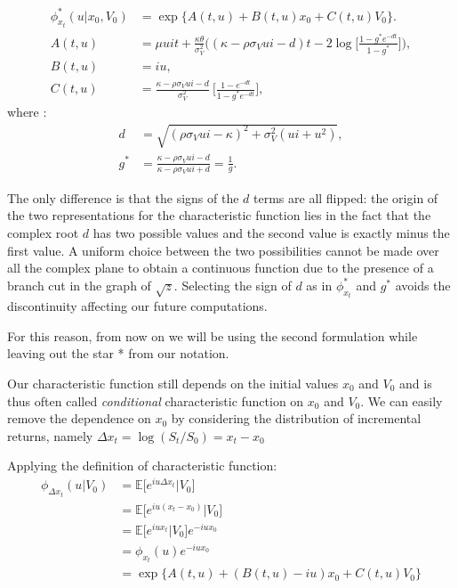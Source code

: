 \begin{subequations}
\begin{align}
\label{eq:heston_chf_trap}
\phi_{x_t}^*(u| x_0, V_0) &= \exp\{A(t,u) + B(t,u) x_0 + C(t,u) V_0\}.\nonumber\\
A(t,u) &= \mu u i t +  \frac{\kappa\theta}{\sigma_V^2} \bigg( (\kappa - \rho\sigma_V u i - d)t - 2 \log\Big[  \frac{1-g^*e^{-dt}}{1-g^*} \Big] \bigg),\\
B(t,u) &= i u ,\\
C(t,u)&= \frac{\kappa - \rho\sigma_V u i - d}{\sigma_V^2} \:\Big[\frac{1-e^{-dt}}{1-g^*e^{-dt}}\Big],
\end{align}
\end{subequations} 
where :
\begin{equation*}
\begin{split}
d&=\sqrt{(\rho \sigma_V u i - \kappa)^2 + \sigma_V^2(u i + u^2)},\\
g^*&= \frac{\kappa - \rho\sigma_V u i - d}{\kappa - \rho\sigma_V u i + d} = \frac{1}{g}.
\end{split}
\end{equation*} 

The only difference is that the signs of the $d$ terms are all flipped: the origin of the two representations for the characteristic function lies in the fact that the complex root $d$ has two possible values and the second value is exactly minus the first value.
A uniform choice between the two possibilities cannot be made over all the complex plane to obtain a continuous function due to the presence of a branch cut in the graph of $\sqrt{z}$. Selecting the sign of $d$ as in $\phi_{x_t}^*$ and $g^*$ avoids the discontinuity affecting our future computations.

For this reason, from now on we will be using the second formulation while leaving out the star * from our notation.

\bigskip


Our characteristic function still depends on the initial values $x_0$ and  $V_0$ and is thus often called \textit{conditional} characteristic function on $x_0$ and $V_0$.
We can easily remove the dependence on $x_0$ by considering the distribution of incremental returns, namely $\Delta x_t = \log (S_t / S_0) = x_t - x_0$

Applying the definition of characteristic function:
\begin{equation*}
	\begin{split}
	\phi_{\Delta x_t}(u|V_0) &= \mathbb{E}\big[e^{i u \Delta x_t} |V_0\big] \\
	&=  \mathbb{E}\big[e^{i u ( x_t - x_0)}|V_0\big]\\
	&= \mathbb{E}\big[e^{i u x_t}|V_0\big] e^{-i u x_0}\\
	&= \phi_{x_t}(u) e^{-i u x_0}\\
	&= \exp\{A(t,u) + (B(t,u) - iu) x_0 + C(t,u) V_0\}
	\end{split}
\end{equation*}

